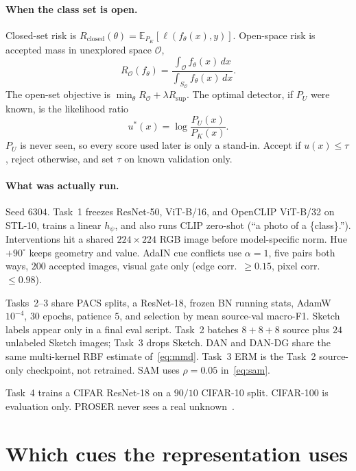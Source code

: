 \documentclass{article}
\begin{document}
\paragraph{When the class set is open.}
Closed-set risk is $R_{\mathrm{closed}}(\theta)=\mathbb{E}_{P_K}[\ell(f_\theta(x),y)]$.
Open-space risk is accepted mass in unexplored space $\mathcal{O}$,
\begin{equation}
  R_{\mathcal{O}}(f_\theta)
  =\frac{\int_{\mathcal{O}}f_\theta(x)\,dx}{\int_{S_{\mathcal{O}}}f_\theta(x)\,dx}.
  \label{eq:open-risk}
\end{equation}
The open-set objective is $\min_\theta R_{\mathcal{O}}+\lambda R_{\mathrm{sup}}$.
The optimal detector, if $P_U$ were known, is the likelihood ratio
\begin{equation}
  u^*(x)=\log\frac{P_U(x)}{P_K(x)}.
  \label{eq:lrt}
\end{equation}
$P_U$ is never seen, so every score used later is only a stand-in.
Accept if $u(x)\le\tau$, reject otherwise, and set $\tau$ on known validation only.

\paragraph{What was actually run.}
Seed $6304$.
Task~1 freezes ResNet-50, ViT-B/16, and OpenCLIP ViT-B/32 on STL-10, trains a linear $h_\psi$, and also runs CLIP zero-shot (``a photo of a \{class\}.'').
Interventions hit a shared $224\times224$ RGB image before model-specific norm.
Hue $+90^\circ$ keeps geometry and value.
AdaIN cue conflicts use $\alpha=1$, five pairs both ways, $200$ accepted images, visual gate only (edge corr.\ $\ge 0.15$, pixel corr.\ $\le 0.98$).

Tasks~2--3 share PACS splits, a ResNet-18, frozen BN running stats, AdamW $10^{-4}$, $30$ epochs, patience $5$, and selection by mean source-val macro-F1.
Sketch labels appear only in a final eval script.
Task~2 batches $8{+}8{+}8$ source plus $24$ unlabeled Sketch images; Task~3 drops Sketch.
DAN and DAN-DG share the same multi-kernel RBF estimate of~\eqref{eq:mmd}.
Task~3 ERM is the Task~2 source-only checkpoint, not retrained.
SAM uses $\rho=0.05$ in~\eqref{eq:sam}.

Task~4 trains a CIFAR ResNet-18 on a $90/10$ CIFAR-10 split.
CIFAR-100 is evaluation only.
PROSER never sees a real unknown~\citep{zhou2021learning}.

\section{Which cues the representation uses}
\label{sec:cues}
\end{document}
